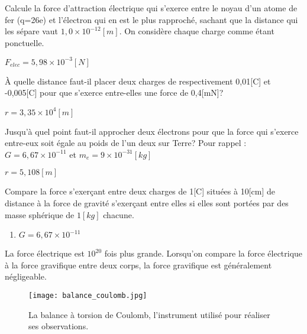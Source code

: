 \begin{exercise}
    Calcule la force d'attraction électrique qui s'exerce entre le noyau d'un atome de fer (q=26e) et l'électron qui en est le plus rapproché, sachant que la distance qui les sépare vaut \(1,0 \times 10^{-12}[m]\). On considère chaque charge comme étant ponctuelle.
\end{exercise}
\begin{solution}
    \(F_{elec}=5,98 \times 10^{-3}[N]\)
\end{solution}

\begin{exercise}
    À quelle distance faut-il placer deux charges de respectivement 0,01[C] et -0,005[C] pour que s'exerce entre-elles une force de 0,4[mN]?
\end{exercise}
\begin{solution}
    \(r=3,35 \times 10^4 [m]\)
\end{solution}

\begin{exercise}
    Jusqu'à quel point faut-il approcher deux électrons pour que la force qui s'exerce entre-eux soit égale au poids de l'un deux sur Terre?
    Pour rappel : \(G=6,67 \times 10^{-11}\) et \(m_e=9 \times 10^{-31} [kg]\)
\end{exercise}
\begin{solution}
    \(r=5,108[m]\)
\end{solution}


\begin{exercise}
    Compare la force s'exerçant entre deux charges de 1[C] situées à 10[cm] de distance à la force de gravité s'exerçant entre elles si elles sont portées par des masse sphérique de \(1 [kg]\) chacune.
    \begin{enumerate}[label=\textbullet]
        \item \(G=6,67 \times 10^{-11}\)
    \end{enumerate}
\end{exercise}
\begin{solution}
    La force électrique est \(10^20\) fois plus grande. Lorsqu'on compare la force électrique à la force gravifique entre deux corps, la force gravifique est généralement négligeable.
\end{solution}

\begin{figure}[!ht]
    \centering
    \texttt{[image: balance\_coulomb.jpg]}
    \caption{La balance à torsion de Coulomb, l'instrument utilisé pour réaliser ses observations.}
    \label{balance_coulomb}
\end{figure}
